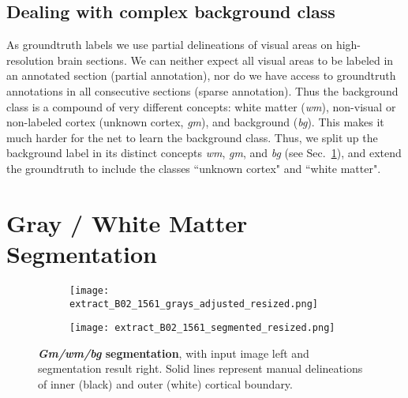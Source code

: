 \documentclass{article}
\begin{document}
\vspace*{-.5\baselineskip}
\subsection{Dealing with complex background class}
\label{sec:arch:labels}
\vspace*{-.5\baselineskip}

As groundtruth labels we use partial delineations of visual areas on high-resolution brain sections.
We can neither expect all visual areas to be labeled in an annotated section (partial annotation), nor do we have access to groundtruth annotations in all consecutive sections (sparse annotation).
Thus the background class is a compound of very different concepts: white matter (\emph{wm}), non-visual or non-labeled cortex (unknown cortex, \emph{gm}), and background (\emph{bg}).
This makes it much harder for the net to learn the background class.
Thus, we split up the background label in its distinct concepts \emph{wm}, \emph{gm}, and \emph{bg} (see Sec.~\ref{sec:seg}), and extend the groundtruth to include the classes ``unknown cortex" and ``white matter".

\section{Gray / White Matter Segmentation}
\label{sec:seg}

\begin{figure} %
		\centering
		\begin{subfigure}[t]{.38\linewidth}
			\centering
			\texttt{[image: extract\_B02\_1561\_grays\_adjusted\_resized.png]}
		\end{subfigure}%
		\begin{subfigure}[t]{.38\linewidth}
			\centering
			\texttt{[image: extract\_B02\_1561\_segmented\_resized.png]}
		\end{subfigure}
		\caption{
			\textbf{\emph{Gm/wm/bg} segmentation}, with input image left and segmentation result right.
			Solid lines represent manual delineations of inner (black) and outer (white) cortical boundary.
		}
		\label{fig:bgseg}
\end{figure}
\end{document}
